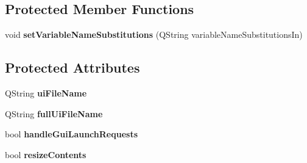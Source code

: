 \subsection*{Protected Member Functions}
\begin{DoxyCompactItemize}
\item 
\hypertarget{classQEForm_a7723570d747554fd0e9052221bacc490}{
void {\bfseries setVariableNameSubstitutions} (QString variableNameSubstitutionsIn)}
\label{classQEForm_a7723570d747554fd0e9052221bacc490}

\end{DoxyCompactItemize}
\subsection*{Protected Attributes}
\begin{DoxyCompactItemize}
\item 
\hypertarget{classQEForm_a5f3f5d19eb0ba253ddf59850d0af9ce2}{
QString {\bfseries uiFileName}}
\label{classQEForm_a5f3f5d19eb0ba253ddf59850d0af9ce2}

\item 
\hypertarget{classQEForm_a807b1f79c591190b9ec4f3b7faaa1b41}{
QString {\bfseries fullUiFileName}}
\label{classQEForm_a807b1f79c591190b9ec4f3b7faaa1b41}

\item 
\hypertarget{classQEForm_a7f0f5bbd7355432b8c8b935ce4848ac7}{
bool {\bfseries handleGuiLaunchRequests}}
\label{classQEForm_a7f0f5bbd7355432b8c8b935ce4848ac7}

\item 
\hypertarget{classQEForm_a5bf449b3a82cca85e8c5d8ecaf9d8358}{
bool {\bfseries resizeContents}}
\label{classQEForm_a5bf449b3a82cca85e8c5d8ecaf9d8358}

\end{DoxyCompactItemize}
